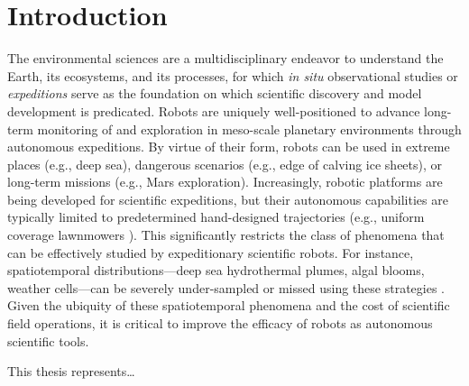 \chapter{Introduction}

The environmental sciences are a multidisciplinary endeavor to understand the Earth, its ecosystems, and its processes, for which \emph{in situ} observational studies or \emph{expeditions} serve as the foundation on which scientific discovery and model development is predicated. Robots are uniquely well-positioned to advance long-term monitoring of and exploration in meso-scale planetary environments through autonomous expeditions. By virtue of their form, robots can be used in extreme places (e.g., deep sea), dangerous scenarios (e.g., edge of calving ice sheets), or long-term missions (e.g., Mars exploration). Increasingly, robotic platforms are being developed for scientific expeditions, but their autonomous capabilities are typically limited to predetermined hand-designed trajectories (e.g., uniform coverage lawnmowers \cite{camilli2010tracking}). This significantly restricts the class of phenomena that can be effectively studied by expeditionary scientific robots. For instance, spatiotemporal distributions---deep sea hydrothermal plumes, algal blooms, weather cells---can be severely under-sampled or missed using these strategies \cite{flaspohler2019information}. Given the ubiquity of these spatiotemporal phenomena and the cost of scientific field operations, it is critical to improve the efficacy of robots as autonomous scientific tools.

This thesis represents\dots
